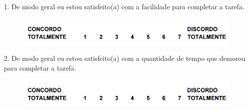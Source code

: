 \begin{flushleft}
1. De modo geral eu estou satisfeito(a) com a facilidade para completar a tarefa.
\begin{figure}[H]	
	\centering
	\includegraphics[scale=0.6]{Imagens/questionarios.png}
	\label{f.questionarios}
\end{figure}

2. De modo geral eu estou satisfeito(a) com a quantidade de tempo que demorou para
completar a tarefa.
\begin{figure}[H]	
	\centering
	\includegraphics[scale=0.6]{Imagens/questionarios.png}
	\label{f.questionarios}
\end{figure}


\end{flushleft}